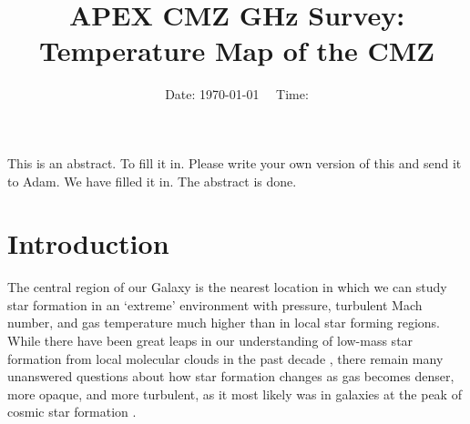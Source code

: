 



\title{APEX CMZ  GHz Survey: Temperature Map of the CMZ}


\date{Date: \today ~~ Time: \currenttime}

\abstract
{This is an abstract.}
{To fill it in.}
{Please write your own version of this and send it to Adam.}
{We have filled it in.}
{The abstract is done.}



\maketitle


\section{Introduction}
The central region of our Galaxy is the nearest location in which we can study
star formation in an `extreme' environment with pressure, turbulent Mach number, 
and gas temperature much higher than in local star forming regions.  While
there have been great leaps in our understanding of low-mass star formation
from local molecular clouds in the past decade
\citep{Lada2012a,Heiderman2010a,Lada2010a}, there remain many unanswered
questions about how star formation changes as gas becomes denser, more opaque,
and more turbulent, as it most likely was in galaxies at the peak of cosmic
star formation \citep{Kruijssen2013a}.


